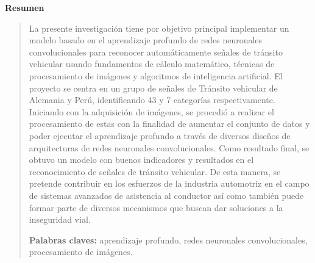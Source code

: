   \newpage
  \begin{center}
   {\bf\LARGE Resumen}
  \end{center} 
  \vskip 0.5cm
  \begin{quotation}
  
  La presente investigación tiene por objetivo principal implementar un modelo basado en el aprendizaje profundo de redes neuronales convolucionales para reconocer automáticamente señales de tránsito vehicular usando fundamentos de cálculo matemático, técnicas de procesamiento de imágenes y algoritmos de inteligencia artificial.
  \vskip 0.2cm
  El proyecto se centra en un grupo de señales de Tránsito vehicular de Alemania y Perú, identificando 43 y 7 categorías respectivamente. Iniciando con  la adquisición de imágenes, se procedió a realizar el procesamiento de estas con la finalidad de aumentar el conjunto de datos y poder ejecutar el aprendizaje profundo a través de diversos diseños de arquitecturas de redes neuronales convolucionales.
  \vskip 0.2cm
  Como resultado final, se obtuvo un modelo con buenos indicadores y resultados en el reconocimiento de señales de tránsito vehicular. De esta manera, se pretende contribuir en los esfuerzos de la industria automotriz en el campo de sistemas avanzados de asistencia al conductor así como también puede formar parte de diversos mecanismos que buscan dar soluciones a la inseguridad vial.

  \vskip 0.2cm
  {\bf Palabras claves:} aprendizaje profundo, redes neuronales convolucionales, procesamiento de imágenes.
  \end{quotation}


